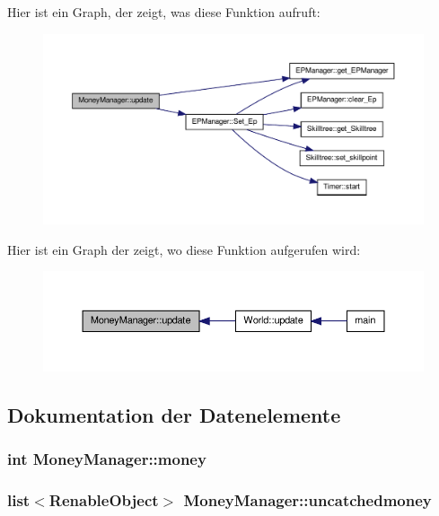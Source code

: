 Hier ist ein Graph, der zeigt, was diese Funktion aufruft\-:\nopagebreak
\begin{figure}[H]
\begin{center}
\leavevmode
\includegraphics[width=350pt]{class_money_manager_a2732c50d4ab200fa9aa89881ddaafe9b_cgraph}
\end{center}
\end{figure}




Hier ist ein Graph der zeigt, wo diese Funktion aufgerufen wird\-:\nopagebreak
\begin{figure}[H]
\begin{center}
\leavevmode
\includegraphics[width=350pt]{class_money_manager_a2732c50d4ab200fa9aa89881ddaafe9b_icgraph}
\end{center}
\end{figure}




\subsection{Dokumentation der Datenelemente}
\hypertarget{class_money_manager_aa396ea903542470a382c2054f1e40dd8}{
\subsubsection[{money}]{\setlength{\rightskip}{0pt plus 5cm}int Money\-Manager\-::money\hspace{0.3cm}{\ttfamily [private]}}}\label{class_money_manager_aa396ea903542470a382c2054f1e40dd8}
\hypertarget{class_money_manager_a803e15bb98cf698f1ad15da4c86f1194}{
\subsubsection[{uncatchedmoney}]{\setlength{\rightskip}{0pt plus 5cm}list$<${\bf Renable\-Object}$>$ Money\-Manager\-::uncatchedmoney\hspace{0.3cm}{\ttfamily [private]}}}\label{class_money_manager_a803e15bb98cf698f1ad15da4c86f1194}


